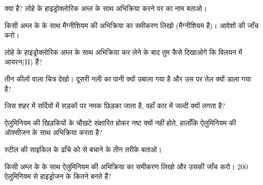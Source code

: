 \begin{exercise}[$\star$]\label{exo:g9:metals-acids-corrosion:4}
 क्या है? लोहे के हाइड्रोक्लोरिक अम्ल के साथ अभिक्रिया करने पर 
का नाम बताओ।
\end{exercise}

\begin{exercise}[$\star\star$]\label{exo:g9:metals-acids-corrosion:5}
किसी अम्ल के   के साथ मैग्नीशियम की अभिक्रिया का समीकरण लिखो
(मैग्नीशियम   है)। आवेशों की जाँच करो।
\end{exercise}

\begin{exercise}[$\star\star$]\label{exo:g9:metals-acids-corrosion:6}
लोहे के हाइड्रोक्लोरिक अम्ल के साथ अभिक्रिया कर लेने के बाद तुम कैसे दिखाओगे कि
विलयन में आयरन(II)  हैं?
\end{exercise}

\begin{exercise}[$\star\star$]\label{exo:g9:metals-acids-corrosion:7}
तीन कीलों वाला चित्र देखो। दूसरी नली का पानी क्यों उबाला गया है और उस पर
तेल क्यों डाला गया है?
\end{exercise}

\begin{exercise}[$\star\star$]\label{exo:g9:metals-acids-corrosion:8}
जिस शहर में सर्दियों में सड़कों पर नमक छिड़का जाता है, वहाँ कार में  जल्दी क्यों लगता है?
\end{exercise}

\begin{exercise}[$\star\star$]\label{exo:g9:metals-acids-corrosion:9}
ऐलुमिनियम की खिड़कियों के चौखटे संक्षारित होकर नष्ट क्यों नहीं होते, हालाँकि
ऐलुमिनियम  की ऑक्सीजन के साथ अभिक्रिया करता है?
\end{exercise}

\begin{exercise}[$\star\star$]\label{exo:g9:metals-acids-corrosion:10}
स्टील की साइकिल के ढाँचे को  से बचाने के तीन तरीके बताओ।
\end{exercise}

\begin{exercise}[$\star\star\star$]\label{exo:g9:metals-acids-corrosion:11}
किसी अम्ल के   के साथ ऐलुमिनियम की अभिक्रिया का समीकरण लिखो और
उसकी जाँच करो। 200 ऐलुमिनियम  से हाइड्रोजन के कितने  बनते
हैं?
\end{exercise}

